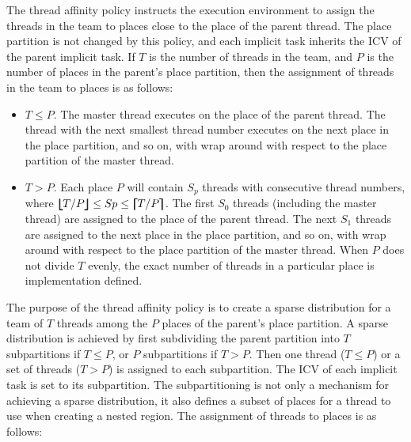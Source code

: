 The  thread affinity policy instructs the execution environment to assign the threads in the team to places close to the place of the parent thread. The place partition is not changed by this policy, and each implicit task inherits the  ICV of the parent implicit task. If $T$ is the number of threads in the team, and $P$ is the number of places in the parent's place partition, then the assignment of threads in the team to places is as follows:

\begin{itemize}
\item $T\leq P$.
The master thread executes on the place of the parent thread. The thread with the next smallest thread number executes on the next place in the place partition, and so on, with wrap around with respect to the place partition of the master thread.
\item $T>P$.
Each place $P$ will contain $S_{p}$ threads with consecutive thread numbers,
where $\blfloor T/P \brfloor \leq Sp \leq \blceil T/P \brceil$. The first $S_{0}$ threads (including the master thread) are assigned to the place of the parent thread. The next $S_{1}$ threads are assigned to the next place in the place partition, and so on, with wrap around with respect to the place partition of the master thread. When $P$ does not divide $T$ evenly, the exact number of threads in a particular place is implementation defined.
\end{itemize}


The purpose of the  thread affinity policy is to create a sparse distribution for a
team of $T$ threads among the $P$ places of the parent's place partition. A sparse distribution is achieved
by first subdividing the parent partition into $T$ subpartitions if
$T\leq P$, or $P$ subpartitions if $T>P$. Then one thread ($T\leq P$) or a
set of threads ($T>P$) is assigned to each subpartition. The
 ICV of each implicit task is set to its subpartition.
The subpartitioning is not only a mechanism for achieving a sparse
distribution, it also defines a subset of places for a thread to use when
creating a nested  region. The assignment of threads to places is as
follows:

